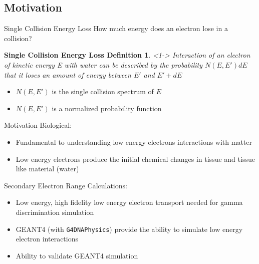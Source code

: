 \documentclass[compress]{beamer}
\begin{document}
\subsection{Motivation}
\begin{frame}{Single Collision Energy Loss}
How much energy does an electron lose in a collision?
  \newtheorem{thm1}{Single Collision Energy Loss Definition}
  \begin{thm1}<1->
    \small
    Interaction of an electron of kinetic energy E with water can be described by the probability $N(E,E')dE$ that it loses an amount of energy between $E'$ and $E'+dE$
  \end{thm1}
  \begin{itemize}
    \item $N(E,E')$ is the single collision spectrum of $E$
    \item $N(E,E')$ is a normalized probability function
  \end{itemize}
\end{frame}
\begin{frame}[fragile]{Motivation}
  Biological:
  \begin{itemize}
  \item Fundamental to understanding low energy electrons interactions with matter
  \item Low energy electrons produce the initial chemical changes in tissue and tissue like material (water)
  \end{itemize}
  Secondary Electron Range Calculations:
  \begin{itemize}
    \item Low energy, high fidelity low energy electron transport needed for gamma discrimination simulation
    \item GEANT4 (with \verb+G4DNAPhysics+) provide the ability to simulate low energy electron interactions
    \item Ability to validate GEANT4 simulation
  \end{itemize}
\end{frame}
\end{document}
